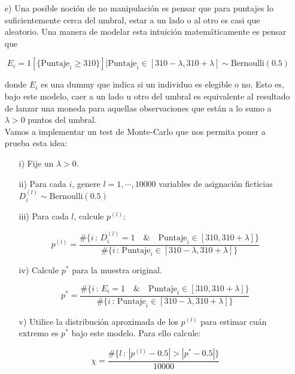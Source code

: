 \documentclass[a4paper]{article}
\begin{document}
\begin{itemize}
    \item[e)] Una posible noción de no manipulación es pensar que para puntajes lo suficientemente cerca del umbral, estar a un lado o al otro es casi que aleatorio. Una manera de modelar esta intuición matemáticamente es pensar que
    
    $$E_i=1[\{\text{Puntaje}_i \geq 310\} ]| \text{Puntaje}_i \in [310-\lambda, 310 +\lambda]   \sim \text{Bernoulli}(0.5)$$
    
    donde $E_i$ es una dummy que indica si un individuo es elegible o no. Esto es, bajo este modelo, caer a un lado u otro del umbral es equivalente al resultado de lanzar una moneda para aquellas observaciones que están a lo sumo a $\lambda>0$ puntos del umbral.\\
    
    Vamos a implementar un test de Monte-Carlo que nos permita poner a prueba esta idea:
    
    \begin{itemize}
    
    
        \item[i)] Fije un $\lambda>0$.\\
        
        \item[ii)] Para cada $i$, genere $l=1,\cdots,10000$ variables de asignación ficticias $D_i^{(l)} \sim \text{Bernoulli}(0.5)$ \\
        
        \item[iii)] Para cada $l$, calcule $p^{(l)}$: 
        
        
        $$p^{(l)}=\dfrac{\# \{  i \, : \, D_i^{(l)}=1 \quad \& \quad  \text{Puntaje}_i \in [310, 310 +\lambda] \} }{\# \{  i \, : \,  \text{Puntaje}_i \in [310-\lambda, 310+\lambda] \}}$$
        
        \item[iv)] Calcule $p^*$ para la muestra original.
        
        $$p^*=\dfrac{\# \{ i \, : \, E_i=1 \quad \& \quad  \text{Puntaje}_i \in [310, 310 +\lambda] \} }{\# \{ i \, : \,  \text{Puntaje}_i \in [310-\lambda, 310+\lambda] \}}$$
        
        \item[v)] Utilice la distribución aproximada de los $p^{(l)}$ para estimar cuán extremo es $p^*$ bajo este modelo. Para ello calcule:
        
        $$\chi=\dfrac{\# \{l \, : \, |p^{(l)}-0.5|>|p^{*}-0.5|\}}{10000}$$
        

\end{itemize}
\end{itemize}
\end{document}
